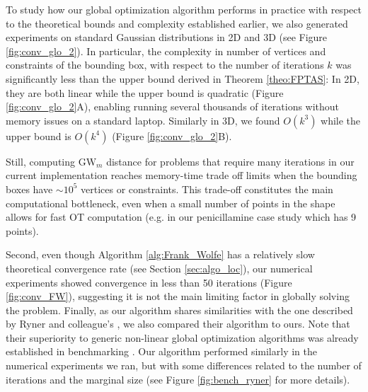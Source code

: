 \documentclass{article}
\newcommand{\1}{\mathbf{1}}
\newcommand{\GW}{\mathrm{GW}}
\theoremstyle{definition}
\theoremstyle{remark}
\begin{document}
To study how our global optimization algorithm performs in practice with respect to the theoretical bounds and complexity established earlier, we also generated experiments on standard Gaussian distributions in 2D and 3D (see Figure \ref{fig:conv_glo_2}). In particular, the complexity in number of vertices and constraints of the bounding box, with respect to the number of iterations $k$ was significantly less than the upper bound derived in Theorem \ref{theo:FPTAS}: In 2D, they are both linear while the upper bound is quadratic (Figure \ref{fig:conv_glo_2}A), enabling running several thousands of iterations without memory issues on a standard laptop. Similarly in 3D, we found 
 $O(k^3)$ while the upper bound is $O(k^4)$ (Figure \ref{fig:conv_glo_2}B).

Still, computing $\GW_m$ distance for problems that require many iterations in our current implementation reaches memory-time trade off limits when the bounding boxes have $\sim 10^5$ vertices or constraints. This trade-off constitutes the main computational bottleneck, even when a small number of points in the shape allows for fast OT computation (e.g. in our penicillamine case study which has 9 points). 

Second, even though Algorithm \ref{alg:Frank_Wolfe} has a relatively slow theoretical convergence rate (see Section \ref{sec:algo_loc}), our numerical experiments showed convergence in less than 50 iterations (Figure \ref{fig:conv_FW}), suggesting it is not the main limiting factor in globally solving the problem. Finally, as our algorithm shares similarities with the one described by Ryner and colleague's \cite{ryner2023globally}, we also compared their algorithm to ours. Note that their superiority to generic non-linear global optimization algorithms was already established in benchmarking \cite{ryner2023globally}. Our algorithm performed similarly in the numerical experiments we ran, but with some differences related to the number of iterations and the marginal size (see Figure \ref{fig:bench_ryner} for more details). 
\end{document}
